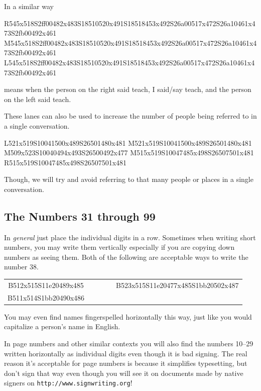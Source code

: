 \documentclass{article}
\begin{document}
In a similar way
\begin{center}
R545x518S2ff00482x483S18510520x491S18518453x492S26a00517x472S26a10461x473S2fb00492x461
M545x518S2ff00482x483S18510520x491S18518453x492S26a00517x472S26a10461x473S2fb00492x461
L545x518S2ff00482x483S18510520x491S18518453x492S26a00517x472S26a10461x473S2fb00492x461
\end{center}
means when the person on the right said teach, I said/say teach, and the person on the left said teach.

These lanes can also be used to increase the number of people being referred to in a single conversation.

\begin{center}
L521x519S10041500x489S26501480x481
M521x519S10041500x489S26501480x481
M509x523S10040494x493S26500492x477
M515x519S10047485x498S26507501x481
R515x519S10047485x498S26507501x481
\end{center}

Though, we will try and avoid referring to that many people or places in a single conversation.

\subsection{The Numbers 31 through 99}

In \emph{general} just place the individual digits in a row.
Sometimes when writing short numbers, you may write them vertically especially if you are copying down numbers as seeing them.
Both of the following are acceptable ways to write the number 38.

\begin{center}
\begin{tabular}{*{3}{c}}
B512x515S11e20489x485&\ \ \ \ \ &B523x515S11e20477x485S1bb20502x487\\
B511x514S1bb20490x486\\
\end{tabular}
\end{center}

You may even find names fingerspelled horizontally this way, just like you would capitalize a person's name in English.

In page numbers and other similar contexts you will also find the numbers 10--29 written horizontally as individual digits even though it is bad signing.
The real reason it's acceptable for page numbers is because it simplifies typesetting, but don't sign that way even though you will see it on documents made by native signers on \texttt{http://www.signwriting.org}!
\end{document}
